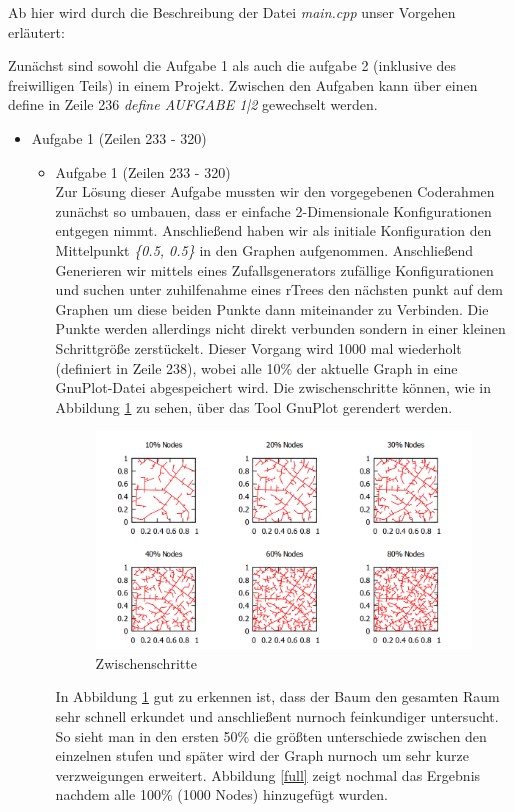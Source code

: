 \documentclass[a4paper]{scrartcl}
\begin{document}
Ab hier wird durch die Beschreibung der Datei \textit{main.cpp} unser Vorgehen erläutert:

Zunächst sind sowohl die Aufgabe 1 als auch die aufgabe 2 (inklusive des freiwilligen Teils) in einem Projekt. Zwischen den Aufgaben kann über einen define in Zeile 236 \textit{define AUFGABE 1|2} gewechselt werden. 

\begin{itemize}
	\item Aufgabe 1 (Zeilen 233 - 320)
	\begin{itemize}
		\item Aufgabe 1 (Zeilen 233 - 320)\\
		Zur Lösung dieser Aufgabe mussten wir den vorgegebenen Coderahmen zunächst so umbauen, dass er einfache 2-Dimensionale Konfigurationen entgegen nimmt. Anschließend haben wir als initiale Konfiguration den Mittelpunkt \textit{\{0.5, 0.5\}} in den Graphen aufgenommen. Anschließend Generieren wir mittels eines Zufallsgenerators zufällige Konfigurationen und suchen unter zuhilfenahme eines rTrees den nächsten punkt auf dem Graphen um diese beiden Punkte dann miteinander zu Verbinden. Die Punkte werden allerdings nicht direkt verbunden sondern in einer kleinen Schrittgröße zerstückelt. Dieser Vorgang wird 1000 mal wiederholt (definiert in Zeile 238), wobei alle 10\% der aktuelle Graph in eine GnuPlot-Datei abgespeichert wird. Die zwischenschritte können, wie in Abbildung \ref{inter} zu sehen, über das Tool GnuPlot gerendert werden.
		\begin{figure}[h!]
			\includegraphics[width=\textwidth]{inter.png}
			\caption{Zwischenschritte}
			\label{inter}
		\end{figure}
		In Abbildung \ref{inter} gut zu erkennen ist, dass der Baum den gesamten Raum sehr schnell erkundet und anschließent nurnoch feinkundiger untersucht. So sieht man in den ersten 50\% die größten unterschiede zwischen den einzelnen stufen und später wird der Graph nurnoch um sehr kurze verzweigungen erweitert. Abbildung \ref{full} zeigt nochmal das Ergebnis nachdem alle 100\% (1000 Nodes) hinzugefügt wurden.

\end{itemize}
\end{itemize}
\end{document}
